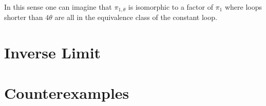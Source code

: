\documentclass[a4paper, 11pt, twoside]{article}
\theoremstyle{break}
\theoremstyle{break}
\begin{document}
In this sense one can imagine that $\pi_{1,\theta}$ is isomorphic to a factor of $\pi_1$ where loops shorter than $4\theta$ are all in the equivalence class of the constant loop.

\section{Inverse Limit}

\section{Counterexamples}

\clearpage

\end{document}
